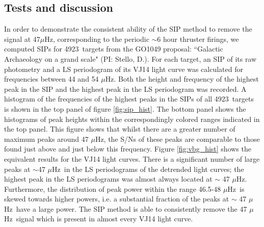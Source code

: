 \documentclass[useAMS, usenatbib, preprint, 12pt]{aastex}
\newcommand{\nGO}{4923}
\newcommand{\uHz}{$\mu$Hz}
\begin{document}
\subsection{Tests and discussion}

In order to demonstrate the consistent ability of the SIP method
to remove the signal at 47\uHz, corresponding to the periodic $\sim$6 hour
thruster firings, we computed SIPs for \nGO\ targets from the GO1049
proposal: ``Galactic Archaeology on a grand scale" (PI: Stello, D.).
For each target, an SIP of its raw photometry and a LS periodogram of its
VJ14 light curve was calculated for frequencies between
44 and 54 \uHz.
Both the height and frequency of the highest peak in the SIP and the highest
peak in the LS periodogram was recorded.
A histogram of the frequencies of the highest peaks in the SIPs of all \nGO\
targets is shown in the top panel of figure \ref{fig:sip_hist}.
The bottom panel shows the histograms of peak heights within the
correspondingly colored ranges indicated in the top panel.
This figure shows that whilst there are a greater number of maximum peaks
around 47 \uHz, the S/Ns of these peaks are comparable to those found just
above and just below this frequency.
Figure \ref{fig:vbg_hist} shows the equivalent results for the
VJ14 light curves.
There is a significant number of large peaks at $\sim$47 \uHz\ in the LS
periodograms of the detrended light curves; the highest peak in the LS
periodograms was almost always located at $\sim$ 47 \uHz.
Furthermore, the distribution of peak power within the range 46.5-48 \uHz\ is
skewed towards higher powers, i.e. a substantial fraction of the peaks at
$\sim$ 47 \uHz\ have a large power.
The SIP method is able to consistently remove the 47 \uHz\ signal which is
present in almost every VJ14 light curve.
\end{document}
